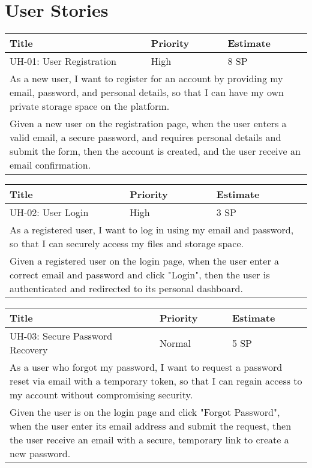 \section{User Stories}

\begin{tabular}{|p{4cm}|p{5cm}|p{5cm}|}
    \hline
    \textbf{Title} & \textbf{Priority} & \textbf{Estimate} \\
    \hline
    UH-01: User Registration & High & 8 SP \\
    \hline
    \multicolumn{3}{|p{14cm}|}{As a new user, I want to register for an account by providing my email, password, and personal details, so that I can have my own private storage space on the platform.} \\
    \hline
    \multicolumn{3}{|p{14cm}|}{Given a new user on the registration page, when the user enters a valid email, a secure password, and requires personal details and submit the form, then the account is created, and the user receive an email confirmation.} \\
    \hline
\end{tabular}

\vspace{5mm}
\begin{tabular}{|p{4cm}|p{5cm}|p{5cm}|}
    \hline
    \textbf{Title} & \textbf{Priority} & \textbf{Estimate} \\
    \hline
    UH-02: User Login & High & 3 SP \\
    \hline
    \multicolumn{3}{|p{14cm}|}{As a registered user, I want to log in using my email and password, so that I can securely access my files and storage space.} \\
    \hline
    \multicolumn{3}{|p{14cm}|}{Given a registered user on the login page, when the user enter a correct email and password and click "Login", then the user is authenticated and redirected to its personal dashboard.} \\
    \hline
\end{tabular}

\vspace{5mm}
\begin{tabular}{|p{4cm}|p{5cm}|p{5cm}|}
    \hline
    \textbf{Title} & \textbf{Priority} & \textbf{Estimate} \\
    \hline
    UH-03: Secure Password Recovery & Normal & 5 SP \\
    \hline
    \multicolumn{3}{|p{14cm}|}{As a user who forgot my password, I want to request a password reset via email with a temporary token, so that I can regain access to my account without compromising security.} \\
    \hline
    \multicolumn{3}{|p{14cm}|}{Given the user is on the login page and click "Forgot Password", when  the user enter its email address and submit the request, then the user receive an email with a secure, temporary link to create a new password.} \\
    \hline
\end{tabular}

